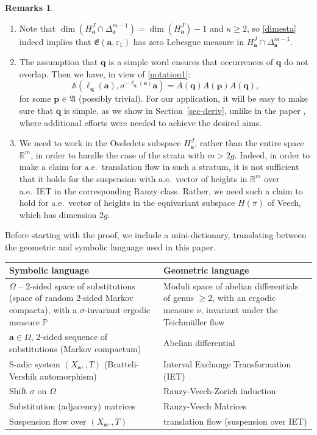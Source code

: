 \documentclass[10pt]{amsart}
\let\epsilon\varepsilon
\theoremstyle{plain}
\theoremstyle{definition}
\newtheorem*{rems*}{Remarks}
\newcommand\bom{{\boldsymbol a}}\let\ba\bom
\newcommand\bp{{\boldsymbol p}}
\newcommand\bq{{\boldsymbol q}}
\let\Om\Omega
\let\sig\sigma
\newcommand\FrA{\mathfrak{A}}
\newcommand\Fre{\mathfrak{E}}
\newcommand\Aa{\mathbb{A}}
\newcommand{\R}{\mathbb{R}}
\renewcommand{\P}{\mathbb{P}}
\newcommand\be{\begin{equation}}
\newcommand\ee{\end{equation}}
\providecommand{\skpt}{\par\smallskip\noindent}
\begin{document}
\pagebreak[2]
\skpt
\begin{rems*}
\begin{enumerate}
\item
Note that $\dim( H^J_\bom \cap \Delta_\bom^{m-1}) = \dim(H^J_\bom)-1$ and $\kappa\ge 2$, so \eqref{dimesta} indeed implies that $\Fre(\bom,\epsilon_1)$ has zero Lebesgue measure in $H^J_\bom \cap \Delta_\bom^{m-1}$.

\item
The assumption that $\bq$ is a simple word ensures that occurrences of $\bq$ do not overlap. Then we have, in view of \eqref{notation1}:
\be \label{egstar}
\Aa(\ell_\bq(\bom), \sig^{-\ell_\bq(\bom)}\bom) = A(\bq) A(\bp) A(\bq),
\ee
for some $\bp \in \FrA$ (possibly trivial). For our application, it will be easy to make sure that $\bq$ is simple, as we show in Section~\ref{sec-deriv}, unlike in the paper \cite{BufGur}, where additional efforts were needed to achieve the desired aims.

\item
We need to work in the Oseledets subspace $H^J_\ba$, rather than the entire space~$\R^m$, in order to handle the case of the strata with
$m>2g$. Indeed, in order to make a claim for a.e.\ translation flow in such a stratum, it is not sufficient that it holds for the suspension with a.e.\ vector of heights in $\R^m$ over a.e.\ IET in the corresponding Rauzy class. Rather, we need such a claim to hold for a.e.\ vector of heights in the equivariant subspace $H(\pi)$ of Veech, which has dimension $2g$.
\end{enumerate}
\end{rems*}

Before starting with the proof, we include a mini-dictionary, translating between the geometric and symbolic language used in this paper.
\begin{table}[h]
\begin{center}
\smaller
\renewcommand{\arraystretch}{1.3}
\begin{tabular}{|p{}|p{}|}
\hline
\hfill Symbolic language\hfill\mbox{}&\hfill Geometric language\hfill\mbox{}\\
\hline
$\Om$ -- 2-sided space of substitutions (space of random 2-sided Markov compacta), with a $\sig$-invariant ergodic measure $\P$ & Moduli space of abelian differentials of genus $\ge 2$, with an ergodic measure $\nu$, invariant under the Teichmüller flow \\
\hline
$\ba\in \Om$, 2-sided sequence of substitutions (Markov compactum) & Abelian differential \\
\hline
S-adic system $(X_{\ba^+},T)$ (Bratteli-Vershik automorphism) &Interval Exchange Transformation (IET)\\
\hline
Shift $\sig$ on $\Om$ & Rauzy-Veech-Zorich induction \\
\hline
Substitution (adjacency) matrices & Rauzy-Veech Matrices \\
\hline
Suspension flow over $(X_{\ba^+},T)$ & translation flow (suspension over IET) \\
\hline
\end{tabular}
\end{center}
\end{table}
\end{document}
